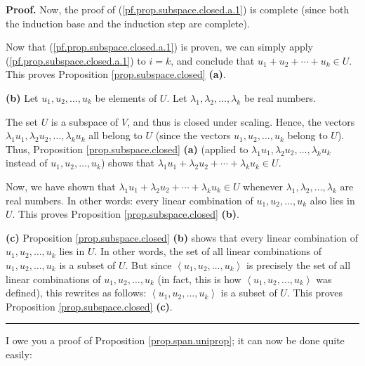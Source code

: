 \documentclass[numbers=enddot,12pt,final,onecolumn,notitlepage]{scrartcl}%
\theoremstyle{definition}
\newenvironment{proof}[1][Proof]{\noindent\textbf{#1.} }{\ \rule{0.5em}{0.5em}}
\begin{document}
\begin{proof}
Now, the proof of (\ref{pf.prop.subspace.closed.a.1}) is complete (since both
the induction base and the induction step are complete).

Now that (\ref{pf.prop.subspace.closed.a.1}) is proven, we can simply apply
(\ref{pf.prop.subspace.closed.a.1}) to $i=k$, and conclude that $u_{1}%
+u_{2}+\cdots+u_{k}\in U$. This proves Proposition \ref{prop.subspace.closed}
\textbf{(a)}.

\textbf{(b)} Let $u_{1},u_{2},\ldots,u_{k}$ be elements of $U$. Let
$\lambda_{1},\lambda_{2},\ldots,\lambda_{k}$ be real numbers.

The set $U$ is a subspace of $V$, and thus is closed under scaling. Hence, the
vectors $\lambda_{1}u_{1},\lambda_{2}u_{2},\ldots,\lambda_{k}u_{k}$ all belong
to $U$ (since the vectors $u_{1},u_{2},\ldots,u_{k}$ belong to $U$). Thus,
Proposition \ref{prop.subspace.closed} \textbf{(a)} (applied to $\lambda
_{1}u_{1},\lambda_{2}u_{2},\ldots,\lambda_{k}u_{k}$ instead of $u_{1}%
,u_{2},\ldots,u_{k}$) shows that $\lambda_{1}u_{1}+\lambda_{2}u_{2}%
+\cdots+\lambda_{k}u_{k}\in U$.

Now, we have shown that $\lambda_{1}u_{1}+\lambda_{2}u_{2}+\cdots+\lambda
_{k}u_{k}\in U$ whenever $\lambda_{1},\lambda_{2},\ldots,\lambda_{k}$ are real
numbers. In other words: every linear combination of $u_{1},u_{2},\ldots
,u_{k}$ also lies in $U$. This proves Proposition \ref{prop.subspace.closed}
\textbf{(b)}.

\textbf{(c)} Proposition \ref{prop.subspace.closed} \textbf{(b)} shows that
every linear combination of $u_{1},u_{2},\ldots,u_{k}$ lies in $U$. In other
words, the set of all linear combinations of $u_{1},u_{2},\ldots,u_{k}$ is a
subset of $U$. But since $\left\langle u_{1},u_{2},\ldots,u_{k}\right\rangle $
is precisely the set of all linear combinations of $u_{1},u_{2},\ldots,u_{k}$
(in fact, this is how $\left\langle u_{1},u_{2},\ldots,u_{k}\right\rangle $
was defined), this rewrites as follows: $\left\langle u_{1},u_{2},\ldots
,u_{k}\right\rangle $ is a subset of $U$. This proves Proposition
\ref{prop.subspace.closed} \textbf{(c)}.
\end{proof}

I owe you a proof of Proposition \ref{prop.span.uniprop}; it can now be done
quite easily:
\end{document}
